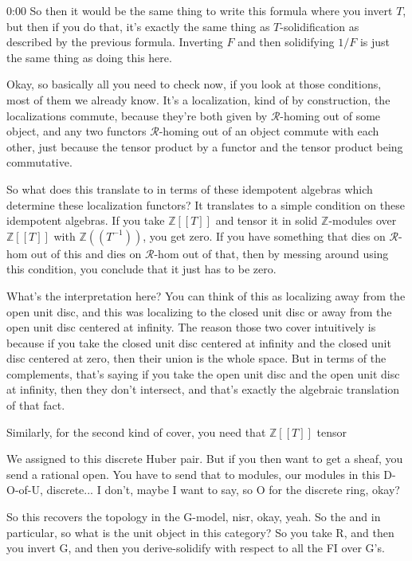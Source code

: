 \begin{unfinished}{0:00}
So then it would be the same thing to write this formula where you invert $T$, but then if you do that, it's exactly the same thing as $T$-solidification as described by the previous formula. Inverting $F$ and then solidifying $1/F$ is just the same thing as doing this here.

Okay, so basically all you need to check now, if you look at those conditions, most of them we already know. It's a localization, kind of by construction, the localizations commute, because they're both given by $\mathcal{R}$-homing out of some object, and any two functors $\mathcal{R}$-homing out of an object commute with each other, just because the tensor product by a functor and the tensor product being commutative.

So what does this translate to in terms of these idempotent algebras which determine these localization functors? It translates to a simple condition on these idempotent algebras. If you take $\mathbb{Z}[[T]]$ and tensor it in solid $\mathbb{Z}$-modules over $\mathbb{Z}[[T]]$ with $\mathbb{Z}((T^{-1}))$, you get zero. If you have something that dies on $\mathcal{R}$-hom out of this and dies on $\mathcal{R}$-hom out of that, then by messing around using this condition, you conclude that it just has to be zero.

What's the interpretation here? You can think of this as localizing away from the open unit disc, and this was localizing to the closed unit disc or away from the open unit disc centered at infinity. The reason those two cover intuitively is because if you take the closed unit disc centered at infinity and the closed unit disc centered at zero, then their union is the whole space. But in terms of the complements, that's saying if you take the open unit disc and the open unit disc at infinity, then they don't intersect, and that's exactly the algebraic translation of that fact.

Similarly, for the second kind of cover, you need that $\mathbb{Z}[[T]]$ tensor

We assigned to this discrete Huber pair. But if you then want to get a sheaf, you send a rational open. You have to send that to modules, our modules in this D-O-of-U, discrete... I don't, maybe I want to say, so O for the discrete ring, okay?

So this recovers the topology in the G-model, nisr, okay, yeah. So the and in particular, so what is the unit object in this category? So you take R, and then you invert G, and then you derive-solidify with respect to all the FI over G's.


\end{unfinished}
